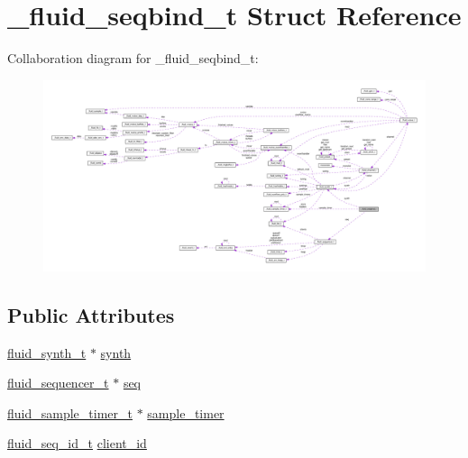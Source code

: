\hypertarget{struct__fluid__seqbind__t}{}\section{\+\_\+fluid\+\_\+seqbind\+\_\+t Struct Reference}
\label{struct__fluid__seqbind__t}


Collaboration diagram for \+\_\+fluid\+\_\+seqbind\+\_\+t\+:
\nopagebreak
\begin{figure}[H]
\begin{center}
\leavevmode
\includegraphics[width=350pt]{struct__fluid__seqbind__t__coll__graph}
\end{center}
\end{figure}
\subsection*{Public Attributes}
\begin{DoxyCompactItemize}
\item 
\hyperlink{types_8h_ae265f10ae174a13afe010de50d87e1a4}{fluid\+\_\+synth\+\_\+t} $\ast$ \hyperlink{struct__fluid__seqbind__t_a99ed9d0077a9549903432101f4db5a8f}{synth}
\item 
\hyperlink{types_8h_a7c7acad4ee620fc954a7ad4d7e87e1c3}{fluid\+\_\+sequencer\+\_\+t} $\ast$ \hyperlink{struct__fluid__seqbind__t_aaafa2156abb39068ee6da5e2b79a5a6d}{seq}
\item 
\hyperlink{fluidsynth__priv_8h_a4ddade88911e1873bccda1a7750a848c}{fluid\+\_\+sample\+\_\+timer\+\_\+t} $\ast$ \hyperlink{struct__fluid__seqbind__t_a33a88eed0dc7ac1b547d32449097a68f}{sample\+\_\+timer}
\item 
\hyperlink{types_8h_a69f729a00307f2b8ec1be0dba2203c12}{fluid\+\_\+seq\+\_\+id\+\_\+t} \hyperlink{struct__fluid__seqbind__t_ad3f537f9c5021105a0fadd1f1f1649f5}{client\+\_\+id}
\end{DoxyCompactItemize}


